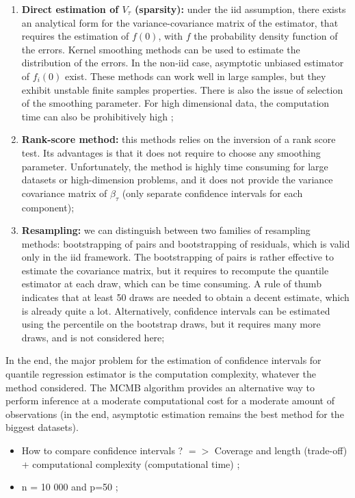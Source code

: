 \documentclass[11pt]{article}
\begin{document}
	\begin{enumerate}
		\item \textbf{Direct estimation of $V_{\tau}$ (sparsity):} under the iid assumption, there exists an analytical form for the variance-covariance matrix of the estimator, that requires the estimation of $f(0)$, with $f$ the probability density function of the errors. Kernel smoothing methods can be used to estimate the distribution of the errors. In the non-iid case, asymptotic unbiased estimator of $f_{i}(0)$ exist. These methods can work well in large samples, but they exhibit unstable finite samples properties. There is also the issue of selection of the smoothing parameter. For high dimensional data, the computation time can also be prohibitively high ;
		
		\item \textbf{Rank-score method:} this methods relies on the inversion of a rank score test. Its advantages is that it does not require to choose any smoothing parameter. Unfortunately, the method is highly time consuming for large datasets or high-dimension problems, and it does not provide the variance covariance matrix of $\beta_{\tau}$ (only separate confidence intervals for each component);
		
		\item \textbf{Resampling:} we can distinguish between two families of resampling methods: bootstrapping of pairs and bootstrapping of residuals, which is valid only in the iid framework. The bootstrapping of pairs is rather effective to estimate the covariance matrix, but it requires to recompute the quantile estimator at each draw, which can be time consuming. A rule of thumb indicates that at least 50 draws are needed to obtain a decent estimate, which is already quite a lot. Alternatively, confidence intervals can be estimated using the  percentile on the bootstrap draws, but it requires many more draws, and is not considered here;
	\end{enumerate}


In the end, the major problem for the estimation of confidence intervals for quantile regression estimator is the computation complexity, whatever the method considered. The MCMB algorithm provides an alternative way to perform inference at a moderate computational cost for a moderate amount of observations (in the end, asymptotic estimation remains the best method for the biggest datasets).



\begin{itemize}
\item How to compare confidence intervals ? $=>$ Coverage and length (trade-off) + computational complexity (computational time) ;

\item n = 10 000 and p=50 ;

\end{itemize}	
	
\end{document}

